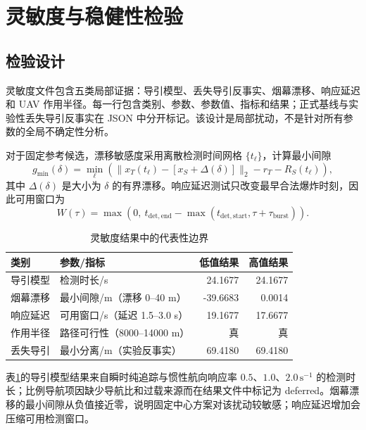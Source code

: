 \section{灵敏度与稳健性检验}

\subsection{检验设计}

灵敏度文件包含五类局部证据：导引模型、丢失导引反事实、烟幕漂移、响应延迟和 UAV 作用半径。每一行包含类别、参数、参数值、指标和结果；正式基线与实验性丢失导引反事实在 JSON 中分开标记。该设计是局部扰动，不是针对所有参数的全局不确定性分析。

对于固定参考候选，漂移敏感度采用离散检测时间网格 $\{t_\ell\}$，计算最小间隙
\begin{equation}
  g_{\min}(\delta)=\min_{\ell}\left(
  \|x_T(t_\ell)-[x_S+\Delta(\delta)]\|_2
  -r_T-R_S(t_\ell)\right),
  \label{eq:sensitivity-gap}
\end{equation}
其中 $\Delta(\delta)$ 是大小为 $\delta$ 的有界漂移。响应延迟测试只改变最早合法爆炸时刻，因此可用窗口为
\begin{equation}
  W(\tau)=\max\left(0,\ t_{\mathrm{det,end}}-
  \max(t_{\mathrm{det,start}},\tau+\tau_{\mathrm{burst}})\right).
  \label{eq:sensitivity-window}
\end{equation}

\begin{table}[!htbp]
\centering
\caption{灵敏度结果中的代表性边界}
\label{tab:sensitivity}
\begin{tabular}{llrr}
\toprule
类别 & 参数/指标 & 低值结果 & 高值结果 \\
\midrule
导引模型 & 检测时长/s & 24.1677 & 24.1677 \\
烟幕漂移 & 最小间隙/m（漂移 0--40 m） & -39.6683 & 0.0014 \\
响应延迟 & 可用窗口/s（延迟 1.5--3.0 s） & 19.1677 & 17.6677 \\
作用半径 & 路径可行性（8000--14000 m） & 真 & 真 \\
丢失导引 & 最小分离/m（实验反事实） & 69.4180 & 69.4180 \\
\bottomrule
\end{tabular}
\end{table}

表\ref{tab:sensitivity}的导引模型结果来自瞬时纯追踪与惯性航向响应率 $0.5$、$1.0$、$2.0\,\mathrm{s}^{-1}$ 的检测时长；比例导航项因缺少导航比和过载来源而在结果文件中标记为 deferred。烟幕漂移的最小间隙从负值接近零，说明固定中心方案对该扰动较敏感；响应延迟增加会压缩可用检测窗口。

